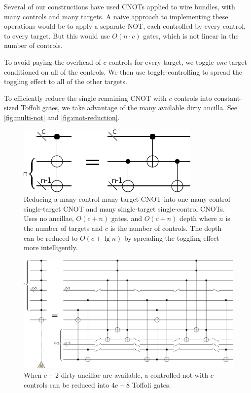 \documentclass[twocolumn,longbibliography]{quantumarticle}
\begin{document}
Several of our constructions have used CNOTs applied to wire bundles, with many controls and many targets.
A naive approach to implementing these operations would be to apply a separate NOT, each controlled by every control, to every target.
But this would use $O(n \cdot c)$ gates, which is not linear in the number of controls.

To avoid paying the overhead of $c$ controls for every target, we toggle {\em one} target conditioned on all of the controls.
We then use toggle-controlling to spread the toggling effect to all of the other targets.

To efficiently reduce the single remaining CNOT with $c$ controls into constant-sized Toffoli gates, we take advantage of the many available dirty ancilla.
See \autoref{fig:multi-not} and \autoref{fig:cnot-reduction}.

\begin{figure}
  \centering
  \includegraphics[width=\linewidth]{assets/multi-cnot-to-single-cnots.png}
  \caption{
    Reducing a many-control many-target CNOT into one many-control single-target CNOT and many single-target single-control CNOTs.
    Uses no ancillae, $O(c + n)$ gates, and $O(c + n)$ depth where $n$ is the number of targets and $c$ is the number of controls.
    The depth can be reduced to $O(c + \lg n)$ by spreading the toggling effect more intelligently.
  }
  \label{fig:multi-not}
\end{figure}

\begin{figure}
  \centering
  \includegraphics[width=\linewidth]{assets/cnot-reduction.png}
  \caption{
    When $c-2$ dirty ancillae are available, a controlled-not with $c$ controls can be reduced into $4c - 8$ Toffoli gates.
  }
  \label{fig:cnot-reduction}
\end{figure}
\end{document}
